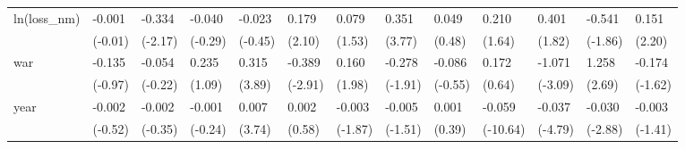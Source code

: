 \begin{tabular}{p{1.5cm} p{1.7cm} p{1.7cm} p{1.7cm} p{1.7cm} p{1.7cm} p{1.7cm} p{1.7cm} p{1.7cm} p{1.7cm} p{1.7cm} p{1.7cm} p{1.7cm}}
\hline
ln(loss\_nm)     &   -0.001         &   -0.334\sym{*}  &   -0.040         &   -0.023         &    0.179\sym{*}  &    0.079         &    0.351\sym{***}&    0.049         &    0.210         &    0.401         &   -0.541         &    0.151\sym{*}  \\
                &  (-0.01)         &  (-2.17)         &  (-0.29)         &  (-0.45)         &   (2.10)         &   (1.53)         &   (3.77)         &   (0.48)         &   (1.64)         &   (1.82)         &  (-1.86)         &   (2.20)         \\
war             &   -0.135         &   -0.054         &    0.235         &    0.315\sym{***}&   -0.389\sym{**} &    0.160         &   -0.278         &   -0.086         &    0.172         &   -1.071\sym{**} &    1.258\sym{**} &   -0.174         \\
                &  (-0.97)         &  (-0.22)         &   (1.09)         &   (3.89)         &  (-2.91)         &   (1.98)         &  (-1.91)         &  (-0.55)         &   (0.64)         &  (-3.09)         &   (2.69)         &  (-1.62)         \\
year            &   -0.002         &   -0.002         &   -0.001         &    0.007\sym{***}&    0.002         &   -0.003         &   -0.005         &    0.001         &   -0.059\sym{***}&   -0.037\sym{***}&   -0.030\sym{**} &   -0.003         \\
                &  (-0.52)         &  (-0.35)         &  (-0.24)         &   (3.74)         &   (0.58)         &  (-1.87)         &  (-1.51)         &   (0.39)         & (-10.64)         &  (-4.79)         &  (-2.88)         &  (-1.41)         \\
\end{tabular}
